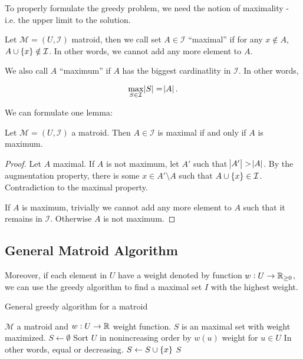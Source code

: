 To properly formulate the greedy problem, we need the notion of maximality - i.e. the upper limit to the solution. 

\begin{define}
    Let $\mathcal{M}=(U, \mathcal{I})$ matroid, then we call set $A \in \mathcal{I}$ ``maximal'' if for any $x \notin A$, $A \cup \cbr{x} \notin \mathcal{I}$. In other words, we cannot add any more element to $A$. 

    We also call $A$ ``maximum'' if $A$ has the biggest cardinatlity in $\mathcal{I}$. In other words, 

    \[
        \max_{S \in \mathcal{I}} \abs{S} = \abs{A}. 
    \]
\end{define}

We can formulate one lemma:

\begin{lemma}
    Let $\mathcal{M}=(U,\mathcal{I})$ a matroid. 
    Then $A \in \mathcal{I}$ is maximal if and only if $A$ is maximum. 
\end{lemma}

\begin{proof}
    \toquotation Let $A$ maximal. If $A$ is not maximum, let $A'$ such that $\abs{A'} > \abs{A}$. 
    By the augmentation property, there is some $x \in A' \setminus A$ such that $A \cup \cbr{x} \in \mathcal{I}$. 
    Contradiction to the maximal property.

    \fromquotation If $A$ is maximum, trivially we cannot add any more element to $A$ such that it remains in $\mathcal{I}$. Otherwise $A$ is not maximum. 
\end{proof}

\subsection{General Matroid Algorithm}

Moreover, if each element in $U$ have a weight denoted by function $w: U \to \mathbb{{R}}_{\ge 0}$, we can use the greedy algorithm to find a maximal set $I$ with the highest weight.

\begin{algorithm}[H]
\caption{General greedy algorithm for a matroid}
\label{greedy-matroid}
\begin{algorithmic}[1]
    \Require $\mathcal{M}$ a matroid and $w: U \to \mathbb{{R}}$ weight function. 
    \Ensure $S$ is an maximal set with weight maximized. 
        \State $S \gets \emptyset$
        \State Sort $U$ in nonincreasing order by $w(u)$ weight for $u \in U$ \Comment In other words, equal or decreasing.
                \State $S \gets S \cup \cbr{x}$
            \EndIf
        \EndFor
        \State \Return $S$ 
    \EndFunction
\end{algorithmic}
\end{algorithm}

